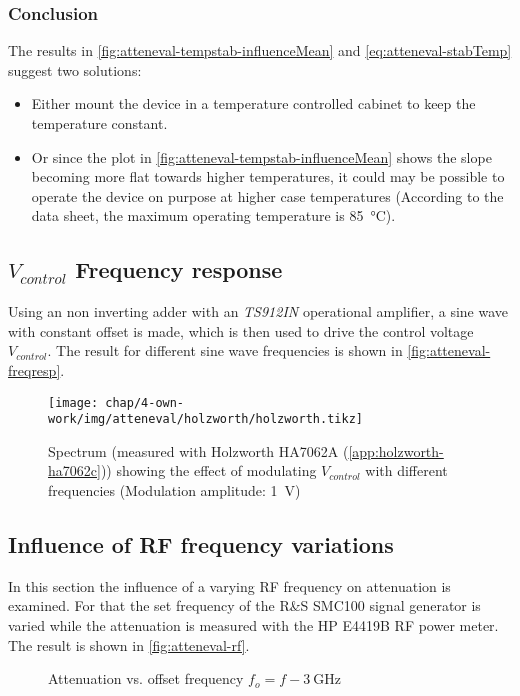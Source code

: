 \FloatBarrier
\subsubsection{Conclusion}
The results in \autoref{fig:atteneval-tempstab-influenceMean} and \autoref{eq:atteneval-stabTemp} suggest two solutions:
\begin{itemize}
\item Either mount the device in a temperature controlled cabinet to keep the temperature constant.
\item Or since the plot in \autoref{fig:atteneval-tempstab-influenceMean} shows the slope becoming more flat towards higher temperatures, it could may be possible to operate the device on purpose at higher case temperatures (According to the data sheet\cite{mini-circuitsZX732500VoltageVariable}, the maximum operating temperature is \SI{85}{\degreeCelsius}).
\end{itemize}

\FloatBarrier
\subsection{$V_{control}$ Frequency response}
Using an non inverting adder with an \textit{TS912IN} operational amplifier, a sine wave with constant offset is made, which is then used to drive the control voltage $V_{control}$. The result for different sine wave frequencies is shown in \autoref{fig:atteneval-freqresp}.

\begin{figure}[tb]
	\centering
	\texttt{[image: chap/4-own-work/img/atteneval/holzworth/holzworth.tikz]}
	\caption{Spectrum (measured with Holzworth HA7062A (\autoref{app:holzworth-ha7062c})) showing the effect of modulating $V_{control}$ with different frequencies (Modulation amplitude: \SI{1}{\volt})}
	\label{fig:atteneval-freqresp}
\end{figure}

\FloatBarrier
\subsection{Influence of RF frequency variations}
In this section the influence of a varying RF frequency on attenuation is examined. For that the set frequency of the R\&S SMC100 signal generator is varied while the attenuation is measured with the HP E4419B RF power meter. The result is shown in \autoref{fig:atteneval-rf}.
\begin{figure}[tb]
    \centering
        \subfloat[$f_o=\SI{+-30}{\kHz}$]{}
        \qquad
        \subfloat[$f_o=\SI{+-1}{\kHz}$]{}
       \caption{Attenuation vs. offset frequency $f_o=f-\SI{3}{\GHz}$}
    \label{fig:atteneval-rf}
\end{figure}

